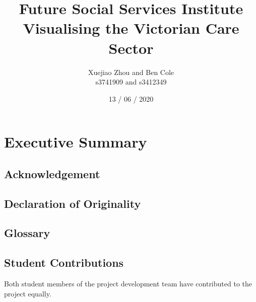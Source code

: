 \documentclass[
  11pt,
]{article}
\title{Future Social Services Institute\\
Visualising the Victorian Care Sector}
\author{Xuejiao Zhou and Ben Cole\\
s3741909 and s3412349}
\date{13 / 06 / 2020}
\begin{document}
\maketitle

{
\setcounter{tocdepth}{2}
\tableofcontents
}
\newpage
{}

\hypertarget{executive-summary}{%
\section{Executive Summary}\label{executive-summary}}

\hypertarget{acknowledgement}{%
\subsection{Acknowledgement}\label{acknowledgement}}

\hypertarget{declaration-of-originality}{%
\subsection{Declaration of Originality}\label{declaration-of-originality}}

\hypertarget{glossary}{%
\subsection{Glossary}\label{glossary}}

\hypertarget{student-contributions}{%
\subsection{Student Contributions}\label{student-contributions}}

Both student members of the project development team have contributed to the project equally.
\end{document}
